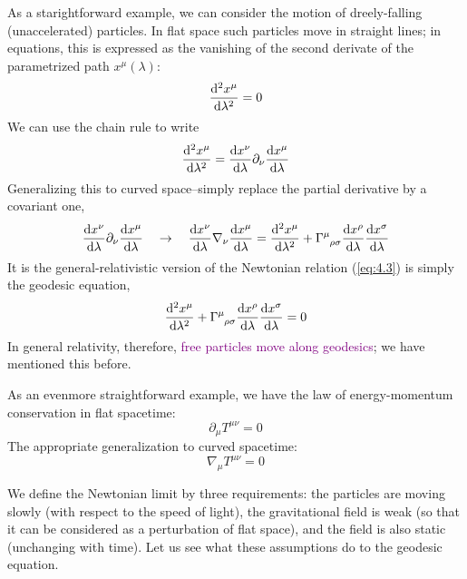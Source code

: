\begin{tcolorbox}
As a starightforward example, we can consider the motion of dreely-falling (unaccelerated) particles. In flat space such particles move in straight lines; in equations, this is expressed as the vanishing of the second derivate of the parametrized path $x^\mu(\lambda)$:
\begin{equation}\label{eq:4.3}
    \dv[2]{x^\mu}{\lambda}=0
\end{equation}
We can use the chain rule to write
\begin{equation*}
    \dv[2]{x^\mu}{\lambda}=\dv{x^\nu}{\lambda}\partial_\nu\dv{x^\mu}{\lambda}
\end{equation*}
Generalizing this to curved space--simply replace the partial derivative by a covariant one,
\begin{equation*}
    \dv{x^\nu}{\lambda}\partial_\nu\dv{x^\mu}{\lambda}\quad \to\quad \dv{x^\nu}{\lambda}\nabla_\nu\dv{x^\mu}{\lambda}=\dv[2]{x^\mu}{\lambda} + \tensor{\Gamma}{^\mu_{\rho\sigma}}\dv{x^\rho}{\lambda}\dv{x^\sigma}{\lambda}
\end{equation*}
It is the general-relativistic version of the Newtonian relation (\ref{eq:4.3}) is simply the geodesic equation,
\begin{equation*}
    \dv[2]{x^\mu}{\lambda} + \tensor{\Gamma}{^\mu_{\rho\sigma}}\dv{x^\rho}{\lambda}\dv{x^\sigma}{\lambda}=0
\end{equation*}
In general relativity, therefore, \textcolor{purple}{free particles move along geodesics}; we have mentioned this before.
\end{tcolorbox}

\begin{tcolorbox}
As an evenmore straightforward example, we have the law of energy-momentum conservation in flat spacetime:
\begin{equation*}
    \partial_\mu T^{\mu\nu}=0
\end{equation*}
The appropriate generalization to curved spacetime:
\begin{equation*}
    \nabla_\mu T^{\mu\nu}=0
\end{equation*}
\end{tcolorbox}

We define the Newtonian limit by three requirements: the particles are moving slowly (with respect to the speed of light), the gravitational field is weak (so that it can be considered as a perturbation of flat space), and the field is also static (unchanging with time). Let us see what these assumptions do to the geodesic equation. 

